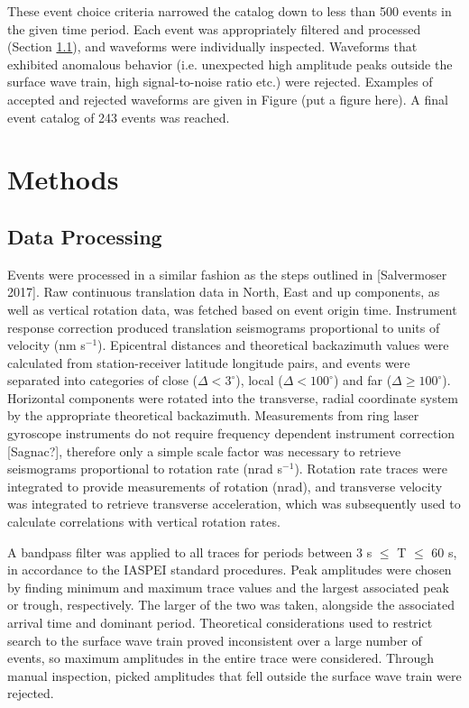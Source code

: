 \documentclass{gji}
\begin{document}
These event choice criteria narrowed the catalog down to less than 500 events in the given time period. Each event was appropriately filtered and processed (Section \ref{sec:dataproc}), and waveforms were individually inspected. Waveforms that exhibited anomalous behavior (i.e. unexpected high amplitude peaks outside the surface wave train, high signal-to-noise ratio etc.) were rejected. Examples of accepted and rejected waveforms are given in Figure (put a figure here). A final event catalog of 243 events was reached.

\section{Methods}
\subsection{Data Processing}\label{sec:dataproc}
Events were processed in a similar fashion as the steps outlined in [Salvermoser 2017]. %
Raw continuous translation data in North, East and up components, as well as vertical rotation data, was fetched based on event origin time. Instrument response correction produced translation seismograms proportional to units of velocity (nm s$^{-1}$). Epicentral distances and theoretical backazimuth values were calculated from station-receiver latitude longitude pairs, and events were separated into categories of close ($\Delta < 3^\circ$), local ($\Delta <100^\circ$) and far ($\Delta \ge 100^\circ$). Horizontal components were rotated into the transverse, radial coordinate system by the appropriate theoretical backazimuth. Measurements from ring laser gyroscope instruments do not require frequency dependent instrument correction [Sagnac?], %
therefore only a simple scale factor was necessary to retrieve seismograms proportional to rotation rate (nrad s$^{-1}$). Rotation rate traces were integrated to provide measurements of rotation (nrad), and transverse velocity was integrated to retrieve transverse acceleration, which was subsequently used to calculate correlations with vertical rotation rates.

A bandpass filter was applied to all traces for periods between 3 s $\le$ T $\le$ 60 s, in accordance to the IASPEI standard procedures. Peak amplitudes were chosen by finding minimum and maximum trace values and the largest associated peak or trough, respectively. The larger of the two was taken, alongside the associated arrival time and dominant period. %
Theoretical considerations used to restrict search to the surface wave train proved inconsistent over a large number of events, so maximum amplitudes in the entire trace were considered. Through manual inspection, picked amplitudes that fell outside the surface wave train were rejected. %
\end{document}
